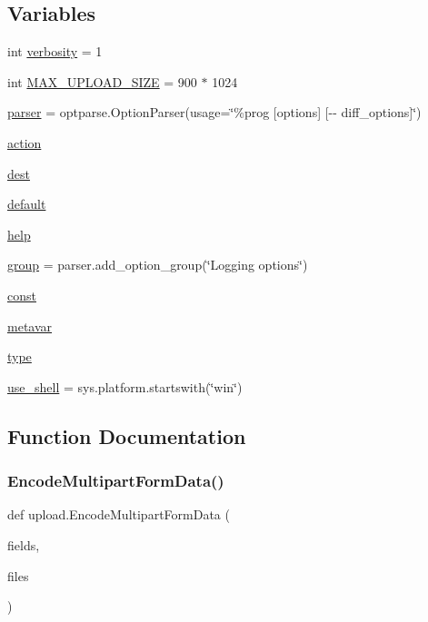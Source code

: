 \subsection*{Variables}
\begin{DoxyCompactItemize}
\item 
int \hyperlink{namespaceupload_a79aff46409a98c4e5f608c8df1fd4612}{verbosity} = 1
\item 
int \hyperlink{namespaceupload_aad5b1a43823e2a710a2f78e33dde8901}{M\+A\+X\+\_\+\+U\+P\+L\+O\+A\+D\+\_\+\+S\+I\+ZE} = 900 $\ast$ 1024
\item 
\hyperlink{namespaceupload_af9e508d19dc2dd9cdb7c642dde0bdd21}{parser} = optparse.\+Option\+Parser(usage=\char`\"{}\%prog \mbox{[}options\mbox{]} \mbox{[}-\/-\/ diff\+\_\+options\mbox{]}\char`\"{})
\item 
\hyperlink{namespaceupload_a675d13c979f1c720866d22ed1736f580}{action}
\item 
\hyperlink{namespaceupload_a770d9c7b49b1fede80de6078d5e49af7}{dest}
\item 
\hyperlink{namespaceupload_af4be925d9a50d5ad134d86400509d0f2}{default}
\item 
\hyperlink{namespaceupload_abfc23c9aa2d9b777678da117a85929a5}{help}
\item 
\hyperlink{namespaceupload_a9d33d66de17175dced88ffe95f079226}{group} = parser.\+add\+\_\+option\+\_\+group(\char`\"{}Logging options\char`\"{})
\item 
\hyperlink{namespaceupload_a985aa9a71de3eb507344df65700c696d}{const}
\item 
\hyperlink{namespaceupload_af1cea8af5389f0ab2d8b65b2c0fd2fe0}{metavar}
\item 
\hyperlink{namespaceupload_a4fc56f0dd6613be15c3c4dc3af3619ce}{type}
\item 
\hyperlink{namespaceupload_afa85ceef00a65cd276a856404eb5f310}{use\+\_\+shell} = sys.\+platform.\+startswith(\char`\"{}win\char`\"{})
\end{DoxyCompactItemize}


\subsection{Function Documentation}
\mbox{\label{namespaceupload_ae12985a2c860c124c502dd2099b702eb}} 
\subsubsection{\texorpdfstring{Encode\+Multipart\+Form\+Data()}{EncodeMultipartFormData()}}
{\footnotesize\ttfamily def upload.\+Encode\+Multipart\+Form\+Data (\begin{DoxyParamCaption}\item[{}]{fields,  }\item[{}]{files }\end{DoxyParamCaption})}

